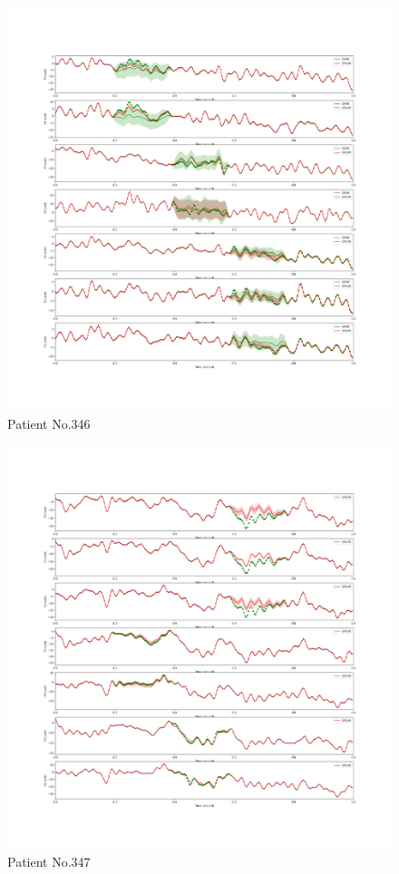 \documentclass{article}
\begin{document}
\begin{figure}[H]
\centering
\includegraphics[width=.8\linewidth]{346-eeg-bi-gplar.png}
\caption{Patient No.346}
\end{figure}

\begin{figure}[H]
\centering
\includegraphics[width=.8\linewidth]{347-eeg-bi-gplar.png}
\caption{Patient No.347}
\end{figure}
\end{document}
